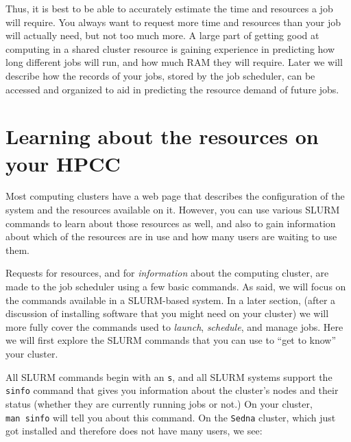 \documentclass[]{krantz}
\makeatletter
\newenvironment{Shaded}{\begin{snugshade}}{\end{snugshade}}
\newcommand{\ExtensionTok}[1]{#1}
\newcommand{\NormalTok}[1]{#1}
\newenvironment{kframe}{%
\medskip{}
\setlength{\fboxsep}{.8em}
 \def\at@end@of@kframe{}%
 \ifinner\ifhmode%
  \def\at@end@of@kframe{\end{minipage}}%
  \begin{minipage}{\columnwidth}%
 \fi\fi%
 \def\FrameCommand##1{\hskip\@totalleftmargin \hskip-\fboxsep
 \colorbox{shadecolor}{##1}\hskip-\fboxsep
     \hskip-\linewidth \hskip-\@totalleftmargin \hskip\columnwidth}%
 \MakeFramed {\advance\hsize-\width
   \@totalleftmargin\z@ \linewidth\hsize
   \@setminipage}}%
 {\par\unskip\endMakeFramed%
 \at@end@of@kframe}
\renewenvironment{Shaded}{\begin{kframe}}{\end{kframe}}
\makeatother
\begin{document}
Thus, it is best to be able to accurately estimate the time and resources a job will
require. You always want to request more time and resources than your job will
actually need, but not too much more. A large part of getting good at computing
in a shared cluster resource is gaining experience in predicting how long different jobs will
run, and how much RAM they will require. Later we will describe how the records of your
jobs, stored by the job scheduler, can be accessed and organized to aid in predicting
the resource demand of future jobs.

\hypertarget{slurm-info}{%
\section{Learning about the resources on your HPCC}\label{slurm-info}}

Most computing clusters have a web page that describes the configuration of the system
and the resources available on it. However, you can use various SLURM commands to
learn about those resources as well, and also to gain information about which
of the resources are in use and how many users are waiting to use them.

Requests for resources, and for \emph{information} about the computing cluster, are made to the job scheduler
using a few basic commands. As said, we will focus on the commands available in a SLURM-based system.
In a later section, (after a discussion of installing software that you might need on your cluster)
we will more fully cover the commands used to \emph{launch}, \emph{schedule}, and manage jobs. Here
we will first explore the SLURM commands that
you can use to ``get to know'' your cluster.

All SLURM commands begin with an \texttt{s}, and all SLURM systems support the \texttt{sinfo} command
that gives you information about the cluster's nodes and their status (whether they are currently
running jobs or not.) On your cluster, \texttt{man\ sinfo} will tell you about this command.
On the \texttt{Sedna} cluster, which just got installed and therefore does not
have many users, we see:

\begin{Shaded}
\end{Shaded}
\end{document}
